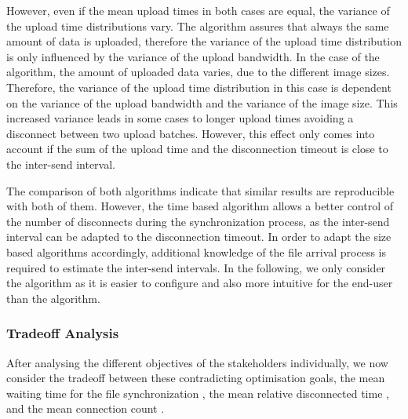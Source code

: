 However, even if the mean upload times in both cases are equal, the variance of the upload time distributions vary.
The \algosize algorithm assures that always the same amount of data is uploaded, therefore the variance of the upload time distribution is only influenced by the variance of the upload bandwidth.
In the case of the \algointerval algorithm, the amount of uploaded data varies, due to the different image sizes.
Therefore, the variance of the upload time distribution in this case is dependent on the variance of the upload bandwidth and the variance of the image size.
This increased variance leads in some cases to longer upload times avoiding a disconnect between two upload batches.
However, this effect only comes into account if the sum of the upload time and the disconnection timeout is close to the inter-send interval.

The comparison of both algorithms indicate that similar results are reproducible with both of them.
However, the time based algorithm allows a better control of the number of disconnects during the synchronization process, as the inter-send interval can be adapted to the disconnection timeout. 
In order to adapt the size based algorithms accordingly, additional knowledge of the file arrival process is required to estimate the inter-send intervals.
In the following, we only consider the \algointerval algorithm as it is easier to configure and also more intuitive for the end-user than the \algosize algorithm. 

\subsubsection*{Tradeoff Analysis}\label{sec:application:cloud_file_synchronisation:numerical_evaluation:trade_off_analysis}

After analysing the different objectives of the stakeholders individually, we now consider the tradeoff between these contradicting optimisation goals, the mean waiting time for the file synchronization \sojournTime, the mean relative disconnected time \relativeDisconnectedTime, and the mean connection count \connectionCount.

